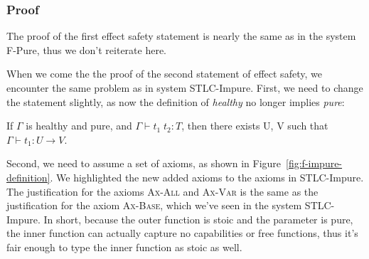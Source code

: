 \subsubsection{Proof}

The proof of the first effect safety statement is nearly the same as
in the system F-Pure, thus we don't reiterate here.

When we come the the proof of the second statement of effect safety,
we encounter the same problem as in system STLC-Impure. First, we need
to change the statement slightly, as now the definition of
\emph{healthy} no longer implies \emph{pure}:

\begin{definition}
  If $\Gamma$ is healthy and pure, and $\Gamma \vdash t_1 \; t_2 : T$, then
  there exists U, V such that $\Gamma \vdash t_1 : U \to V$.
\end{definition}

Second, we need to assume a set of axioms, as shown in
Figure~\ref{fig:f-impure-definition}. We highlighted the new added
axioms to the axioms in STLC-Impure. The justification for the axioms
\textsc{Ax-All} and \textsc{Ax-Var} is the same as the justification
for the axiom \textsc{Ax-Base}, which we've seen in the system
STLC-Impure. In short, because the outer function is stoic and the
parameter is pure, the inner function can actually capture no
capabilities or free functions, thus it's fair enough to type the
inner function as stoic as well.

